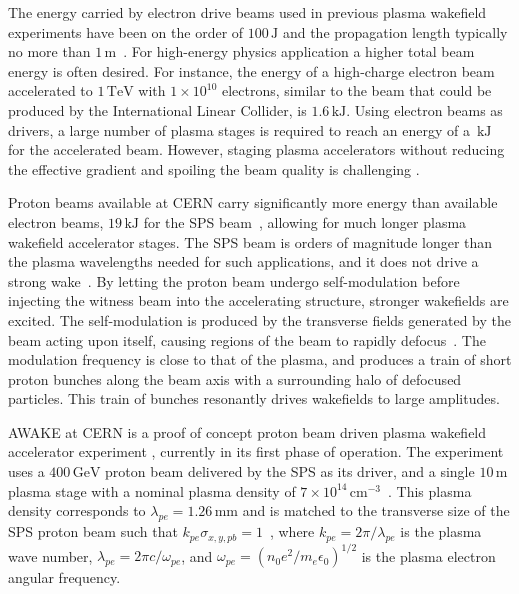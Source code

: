 \documentclass[aps,prstab,reprint,amsmath,amssymb,groupedaddress]{revtex4-1}
\newcommand{\unit}[1]{\,\mathrm{#1}}
\newcommand{\nexp}[1]{\times 10^{#1}}
\begin{document}
The energy carried by electron drive beams used in previous plasma wakefield experiments have been on the order of
$100\unit{J}$ and the propagation length typically no more than $1\unit{m}$~\cite{blumenfeld:2007, caldwell:2009}.
For high-energy physics application a higher total beam energy is often desired. For instance, the energy of a
high-charge electron beam accelerated to $1\unit{TeV}$ with $1\nexp{10}$ electrons, similar to the beam that could be
produced by the International Linear Collider, is $1.6\unit{kJ}$. Using electron beams as drivers, a large number of
plasma stages is required to reach an energy of a $\unit{kJ}$ for the accelerated beam. However, staging plasma
accelerators without reducing the effective gradient and spoiling the beam quality is challenging
\cite{steinke:2016, lindstrom:2016}.

Proton beams available at CERN carry significantly more energy than available electron beams, $19\unit{kJ}$ for the SPS
beam~\cite{gschwendtner:2016}, allowing for much longer plasma wakefield accelerator stages. The SPS beam is orders of
magnitude longer than the plasma wavelengths needed for such applications, and it does not drive a strong
wake~\cite{gschwendtner:2016}. By letting the proton beam undergo self-modulation before injecting the witness beam into
the accelerating structure, stronger wakefields are excited. The self-modulation is produced by the transverse fields
generated by the beam acting upon itself, causing regions of the beam to rapidly defocus~\cite{kumar:2010}. The
modulation frequency is close to that of the plasma, and produces a train of short proton bunches along the beam axis
with a surrounding halo of defocused particles. This train of bunches resonantly drives wakefields to large amplitudes.

AWAKE at CERN is a proof of concept proton beam driven plasma wakefield accelerator experiment
\cite{awake_collaboration:2014}, currently in its first phase of operation. The experiment uses a $400\unit{GeV}$ proton
beam delivered by the SPS as its driver, and a single $10\unit{m}$ plasma stage with a nominal plasma density of
$7\nexp{14}\unit{cm}^{-3}$~\cite{gschwendtner:2016}. This plasma density corresponds to $\lambda_{pe} = 1.26\unit{mm}$
and is matched to the transverse size of the SPS proton beam such that $k_{pe}\sigma_{x,y,pb} = 1$~\cite{lu:2005}, where
$k_{pe} = 2\pi/\lambda_{pe}$ is the plasma wave number, $\lambda_{pe} = 2\pi c/\omega_{pe}$, and
$\omega_{pe} = \left(n_0e^2/m_e\epsilon_0\right)^{1/2}$ is the plasma electron angular frequency.
\end{document}
